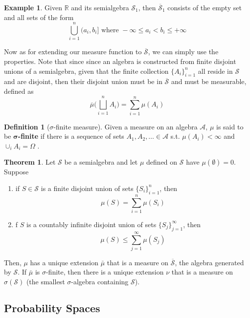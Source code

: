 \documentclass{article}
\theoremstyle{definition}
\newtheorem{theorem}{Theorem}[section]
\newtheorem{example}{Example}[section]
\theoremstyle{remark}
\theoremstyle{definition}
\newtheorem{definition}{Definition}[section]
\begin{document}
\begin{example}
Given $\mathbb{R}$ and its semialgebra $\mathcal{S}_1$, then $\overline{\mathcal{S}}_1$ consists of the empty set and all sets of the form 
\[\bigcup_{i=1}^n (a_i, b_i] \text{ where } -\infty \leq a_i < b_i \leq +\infty\]
\end{example}

Now as for extending our measure function to $\overline{\mathcal{S}}$, we can simply use the properties. Note that since since an algebra is constructed from finite disjoint unions of a semialgebra, given that the finite collection $\{A_i\}_{i=1}^n$ all reside in $\mathcal{S}$ and are disjoint, then their disjoint union must be in $\overline{\mathcal{S}}$ and must be measurable, defined as 
\[\overline{\mu} \bigg( \bigsqcup_{i=1}^n A_i \bigg) = \sum_{i=1}^n \mu(A_i)\]

\begin{definition}[$\sigma$-finite measure]
Given a measure on an algebra $\mathcal{A}$, $\mu$ is said to be \textbf{$\boldsymbol{\sigma}$-finite} if there is a sequence of sets $A_1, A_2, \ldots \in \mathcal{A}$ s.t. $\mu(A_i) < \infty$ and $\cup_i A_i = \Omega$ . 
\end{definition}

\begin{theorem}
Let $\mathcal{S}$ be a semialgebra and let $\mu$ defined on $\mathcal{S}$ have $\mu(\emptyset) = 0$. Suppose 
\begin{enumerate}
    \item if $S \in \mathcal{S}$ is a finite disjoint union of sets $\{S_i\}_{i=1}^n$, then 
    \[\mu(S) = \sum_{i=1}^n \mu(S_i)\]
    \item f $S$ is a countably infinite disjoint union of sets $\{S_j\}_{j=1}^\infty$, then 
    \[\mu(S) \leq \sum_{j=1}^\infty \mu(S_j)\]
\end{enumerate}
Then, $\mu$ has a unique extension $\bar{\mu}$ that is a measure on $\overline{\mathcal{S}}$, the algebra generated by $\mathcal{S}$. If $\bar{\mu}$ is $\sigma$-finite, then there is a unique extension $\nu$ that is a measure on $\sigma(\mathcal{S})$ (the smallest $\sigma$-algebra containing $\mathcal{S}$). 
\end{theorem}


\subsection{Probability Spaces}
\end{document}
